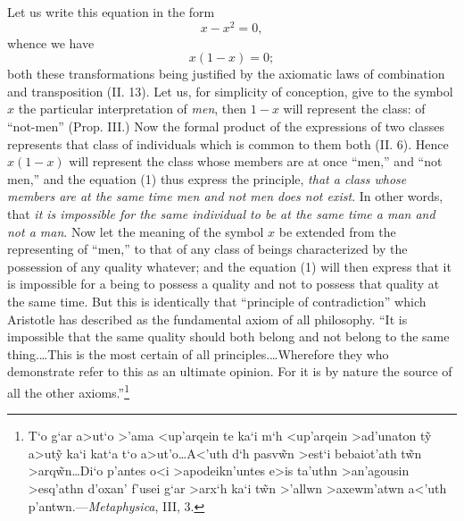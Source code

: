 \documentclass[oneside]{book}
\begin{document}
Let us write this equation in the form
\[
x - x^2 = 0,
\]
whence we have
\setcounter{equation}{0}
\begin{equation}
x\left(1-x\right) = 0;
\end{equation}
both these transformations being justified by the axiomatic laws
of combination and transposition (II. 13). Let us, for simplicity
of conception, give to the symbol $x$ the particular interpretation
of \textit{men}, then $1 - x$ will represent the class: of ``not-men''
(Prop. III.) Now the formal product of the expressions of two
classes represents that class of individuals which is common to
them both (II. 6). Hence $x\left(1 - x\right)$ will represent the class
whose members are at once ``men,'' and ``not men,'' and the
equation (1) thus express the principle, \textit{that a class whose members
are at the same time men and not men does not exist}. In
other words, that \textit{it is impossible for the same individual to be at
the same time a man and not a man}. Now let the meaning of
the symbol $x$ be extended from the representing of ``men,'' to
that of any class of beings characterized by the possession of any
quality whatever; and the equation (1) will then express that it
is impossible for a being to possess a quality and not to possess
that quality at the same time. But this is identically that
``principle of contradiction'' which Aristotle has described as the
fundamental axiom of all philosophy. ``It is impossible that the
same quality should both belong and not belong to the same
thing.\dots This is the most certain of all principles.\dots Wherefore
they who demonstrate refer to this as an ultimate opinion. For
it is by nature the source of all the other axioms.''\footnote{
\textgreek{T`o g`ar a>ut`o >'ama <up'arqein te ka`i m`h <up'arqein >ad'unaton t\~y a>ut\~y ka`i kat`a
t`o a>ut'o\dots A<'uth d`h pasv\~wn  >est`i bebaiot'ath t\~wn >arq\~wn\dots Di`o p'antes o<i >apodeikn'untes
e>is ta'uthn >an'agousin >esq'athn d'oxan' f'usei g`ar >arx`h ka`i t\~wn >'allwn
>axewm'atwn a<'uth p'antwn.}---\textit{Metaphysica}, III, 3.}
\end{document}

